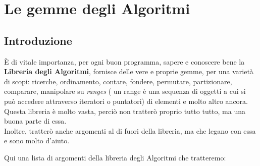 
\chapter{Le gemme degli Algoritmi}



\section{Introduzione}

\textsf{\small È di vitale importanza, per ogni buon programma, sapere e conoscere bene la \textbf{Libreria degli Algoritmi}, fornisce delle vere e proprie gemme, per una varietà di scopi: ricerche, ordinamento, contare, fondere, permutare, partizionare, comparare,  manipolare su \emph{ranges} ( un range è una sequenza di oggetti a cui si può accedere attraverso iteratori o puntatori) di elementi e molto altro ancora. } \\

\textsf{\small Questa libreria è molto vasta, perciò non tratterò proprio tutto tutto, ma una buona parte di essa.} \\

\textsf{\small Inoltre, tratterò anche argomenti al di fuori della libreria, ma che legano con essa e sono molto d'aiuto.} \break

\textsf{\small Qui una lista di argomenti della libreria degli Algoritmi che tratteremo: } \\

